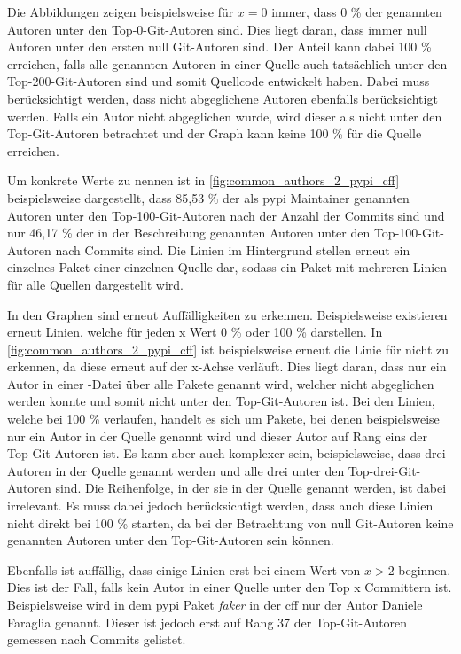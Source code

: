 Die Abbildungen zeigen beispielsweise für $x=0$ immer, dass 0 \% der genannten Autoren unter den Top-0-Git-Autoren sind.
Dies liegt daran, dass immer null Autoren unter den ersten null Git-Autoren sind.
Der Anteil kann dabei 100 \% erreichen, falls alle genannten Autoren in einer Quelle auch tatsächlich unter den Top-200-Git-Autoren sind und somit Quellcode entwickelt haben.
Dabei muss berücksichtigt werden, dass nicht abgeglichene Autoren ebenfalls berücksichtigt werden.
Falls ein Autor nicht abgeglichen wurde, wird dieser als nicht unter den Top-Git-Autoren betrachtet und der Graph kann keine 100 \% für die Quelle erreichen.

Um konkrete Werte zu nennen ist in \autoref{fig:common_authors_2_pypi_cff} beispielsweise dargestellt, dass 85,53 \% der als \gls{pypi} Maintainer genannten Autoren unter den Top-100-Git-Autoren nach der Anzahl der Commits sind und nur 46,17 \% der in der Beschreibung genannten Autoren unter den Top-100-Git-Autoren nach Commits sind.
Die Linien im Hintergrund stellen erneut ein einzelnes Paket einer einzelnen Quelle dar, sodass ein Paket mit mehreren Linien für alle Quellen dargestellt wird.

In den Graphen sind erneut Auffälligkeiten zu erkennen.
Beispielsweise existieren erneut Linien, welche für jeden x Wert 0 \% oder 100 \% darstellen.
In \autoref{fig:common_authors_2_pypi_cff} ist beispielsweise erneut die Linie für  nicht zu erkennen, da diese erneut auf der x-Achse verläuft.
Dies liegt daran, dass nur ein Autor in einer -Datei über alle Pakete genannt wird, welcher nicht abgeglichen werden konnte und somit nicht unter den Top-Git-Autoren ist.
Bei den Linien, welche bei 100 \% verlaufen, handelt es sich um Pakete, bei denen beispielsweise nur ein Autor in der Quelle genannt wird und dieser Autor auf Rang eins der Top-Git-Autoren ist.
Es kann aber auch komplexer sein, beispielsweise, dass drei Autoren in der Quelle genannt werden und alle drei unter den Top-drei-Git-Autoren sind.
Die Reihenfolge, in der sie in der Quelle genannt werden, ist dabei irrelevant.
Es muss dabei jedoch berücksichtigt werden, dass auch diese Linien nicht direkt bei 100 \% starten, da bei der Betrachtung von null Git-Autoren keine genannten Autoren unter den Top-Git-Autoren sein können.

Ebenfalls ist auffällig, dass einige Linien erst bei einem Wert von $x>2$ beginnen.
Dies ist der Fall, falls kein Autor in einer Quelle unter den Top x Committern ist.
Beispielsweise wird in dem \gls{pypi} Paket \emph{faker} in der \gls{cff} nur der Autor \glqq Daniele Faraglia\grqq{} genannt.
Dieser ist jedoch erst auf Rang 37 der Top-Git-Autoren gemessen nach Commits gelistet.

